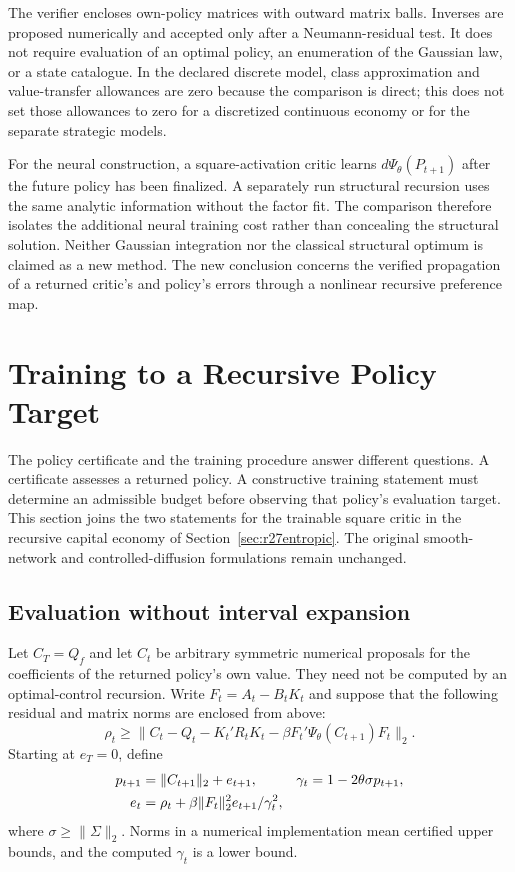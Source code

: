 \documentclass[ecta,nameyear,draft]{econsocart}
\theoremstyle{definition}
\theoremstyle{remark}
\begin{document}
The verifier encloses own-policy matrices with outward matrix balls. Inverses
are proposed numerically and accepted only after a Neumann-residual test.
It does not require evaluation of an optimal policy, an enumeration of the
Gaussian law, or a state catalogue. In the declared discrete model, class
approximation and value-transfer allowances are zero because the comparison
is direct; this does not set those allowances to zero for a discretized
continuous economy or for the separate strategic models.

For the neural construction, a square-activation critic learns
$d\Psi_\theta(P_{t+1})$ after the future policy has been finalized. A separately
run structural recursion uses the same analytic information without the
factor fit. The comparison therefore isolates the additional neural training
cost rather than concealing the structural solution. Neither Gaussian
integration nor the classical structural optimum is claimed as a new method.
The new conclusion concerns the verified propagation of a returned critic's
and policy's errors through a nonlinear recursive preference map.

\section{Training to a Recursive Policy Target}\label{sec:r31constructive}
The policy certificate and the training procedure answer different questions.
A certificate assesses a returned policy. A constructive training statement
must determine an admissible budget before observing that policy's evaluation
target. This section joins the two statements for the trainable square critic
in the recursive capital economy of Section~\ref{sec:r27entropic}. The original
smooth-network and controlled-diffusion formulations remain unchanged.

\subsection{Evaluation without interval expansion}
Let $C_T=Q_f$ and let $C_t$ be arbitrary symmetric numerical proposals for the
coefficients of the returned policy's own value. They need not be computed by
an optimal-control recursion. Write $F_t=A_t-B_tK_t$ and suppose that the
following residual and matrix norms are enclosed from above:
\[
 \rho_t\geq\|C_t-Q_t-K_t'R_tK_t-
                  \beta F_t'\Psi_\theta(C_{t+1})F_t\|_2.
\]
Starting at $e_T=0$, define
\begin{align}
 p_{t+1}&=\|C_{t+1}\|_2+e_{t+1},&
 \gamma_t&=1-2\theta\sigma p_{t+1},\notag\\
 e_t&=\rho_t+\beta\|F_t\|_2^2e_{t+1}/\gamma_t^2,
 \label{eq:r31tube}
\end{align}
where $\sigma\geq\|\Sigma\|_2$. Norms in a numerical implementation mean
certified upper bounds, and the computed $\gamma_t$ is a lower bound.
\end{document}
